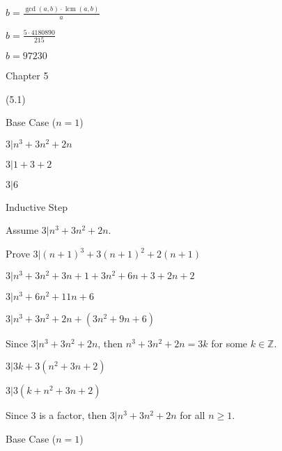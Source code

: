 \documentclass{exam}
\DeclareMathOperator{\lcm}{lcm}
\begin{document}
\begin{questions}
\begin{center}
\(b = \frac{\gcd(a,b) \cdot \lcm(a,b)}{a}\)

\(b = \frac{5 \cdot 4180890}{215}\)

\(b = 97230\)

\end{center}





\vspace{10pt}
{\Large Chapter 5}
\vspace{2pt}

 (5.1)

\begin{center}

Base Case (\(n = 1\))

\(3|n^3 + 3n^2 + 2n\)

\(3|1 + 3 + 2\)

\(3|6\)
\vspace{5px}

Inductive Step

Assume \(3 | n^3 + 3n^2 + 2n\). 

Prove \(3 | (n+1)^3 + 3(n+1)^2 + 2(n+1)\)

\(3 | n^3 + 3n^2 + 3n + 1 + 3n^2 + 6n + 3 + 2n + 2\)

\(3 | n^3 + 6n^2 + 11n + 6\)

\(3 | n^3 + 3n^2 + 2n + (3n^2 + 9n + 6)\)

Since \(3 | n^3 + 3n^2 + 2n\), then \(n^3 + 3n^2 + 2n = 3k\) for some \(k \in \mathbb{Z}\).

\(3 | 3k + 3(n^2 + 3n + 2)\)

\(3 | 3(k+n^2+3n+2)\)

Since 3 is a factor, then \(3 | n^3 + 3n^2 + 2n\) for all \( n \geq 1 \).

\end{center}

\begin{subparts}

\begin{center}

Base Case (\(n = 1\))


\end{center}
\end{subparts}
\end{questions}
\end{document}
